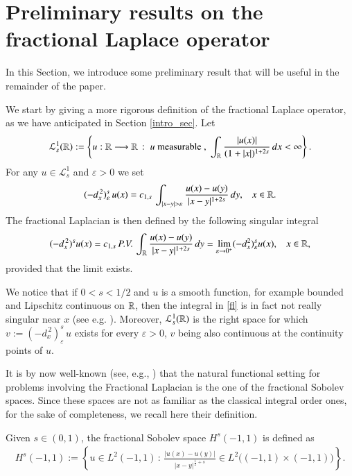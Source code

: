 \section{Preliminary results on the fractional Laplace operator}\label{theor_sec}

In this Section, we introduce some preliminary result that will be useful in the remainder of the paper.


We start by giving a more rigorous definition of the fractional Laplace operator, as we have anticipated in Section \ref{intro_sec}. Let
\begin{align*}
	\mathcal L^1_s(\mathbb{R}) :=\left\{ u:\mathbb{R}\longrightarrow\mathbb{R}\,:\; u\textrm{ measurable },\;\int_{\mathbb{R}}\frac{|u(x)|}{(1+|x|)^{1+2s}}\,dx<\infty\right\}.
\end{align*}
For any $u\in\mathcal L_s^1$ and $\varepsilon>0$ we set 
\begin{align*}
	(-d_x^{\,2})^s_{\varepsilon}\, u(x) = \ccs\,\int_{|x-y|>\varepsilon}\frac{u(x)-u(y)}{|x-y|^{1+2s}}\,dy,\;\;\; x\in\RR.
\end{align*}
The fractional Laplacian is then defined by the following singular integral
\begin{align}\label{fl}
	(-d_x^{\,2})^{s}u(x) = c_{1,s}\,P.V.\,\int_{\mathbb{R}}\frac{u(x)-u(y)}{|x-y|^{1+2s}}\,dy = \lim_{\varepsilon\to 0^+} (-d_x^2)^s_{\varepsilon} u(x), \;\;\; x\in\mathbb{R},
\end{align}
provided that the limit exists. 

We notice that if $0<s<1/2$ and $u$ is a smooth function, for example bounded and Lipschitz continuous on $\mathbb{R}$, then the integral in \eqref{fl} is in fact not really singular near $x$ (see e.g. \cite[Remark 3.1]{dihitchhiker}). Moreover, $\mathcal L_s^1(\mathbb{R})$ is the right space for which $v:= (-d_x^{\,2})^s_{\varepsilon}\, u$ exists for every $\varepsilon > 0$, $v$ being also continuous at the continuity points of $u$.

It is by now well-known (see, e.g., \cite{dihitchhiker}) that the natural functional setting for problems involving the Fractional Laplacian is the one of the fractional Sobolev spaces. Since these spaces are not as familiar as the classical integral order ones, for the sake of completeness, we recall here their definition. 

Given $s\in(0,1)$, the fractional Sobolev space $H^s(-1,1)$ is defined as
\begin{align*}
	H^s(-1,1):= \left\{u\in L^2(-1,1)\,:\, \frac{|u(x)-u(y)|}{|x-y|^{\frac 12+s}}\in L^2\Big((-1,1)\times(-1,1)\Big) \right\}.
\end{align*}


